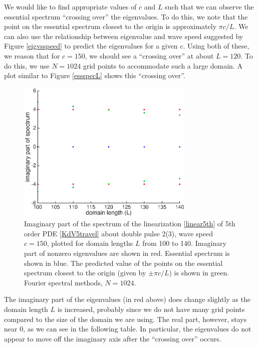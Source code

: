 \documentclass[12pt]{article}
\begin{document}
We would like to find appropriate values of $c$ and $L$ such that we can observe the essential spectrum ``crossing over'' the eigenvalues. To do this, we note that the point on the essential spectrum closest to the origin is approximately $\pi c / L$. We can also use the relationship between eigenvalue and wave speed suggested by Figure \ref{eigvsspeed} to predict the eigenvalues for a given $c$. Using both of these, we reason that for $c = 150$, we should see a ``crossing over'' at about $L = 120$. To do this, we use $N = 1024$ grid points to accommodate such a large domain. A plot similar to Figure \ref{essspecL} shows this ``crossing over''.

\begin{figure}[H]
	\includegraphics[width=8.5cm]{crossingover}
	\caption{Imaginary part of the spectrum of the linearization \eqref{linear5th} of 5th order PDE \eqref{KdV5travel} about double pulse 2(3), wave speed $c = 150$, plotted for domain lengths $L$ from 100 to 140. Imaginary part of nonzero eigenvalues are shown in red. Essential spectrum is shown in blue. The predicted value of the points on the essential spectrum closest to the origin (given by $\pm \pi c/L$) is shown in green. Fourier spectral methods, $N = 1024$.}
\end{figure}

The imaginary part of the eigenvalues (in red above) does change slightly as the domain length $L$ is increased, probably since we do not have many grid points compared to the size of the domain we are using. The real part, however, stays near 0, as we can see in the following table. In particular, the eigenvalues do not appear to move off the imaginary axis after the ``crossing over'' occurs.
\end{document}
